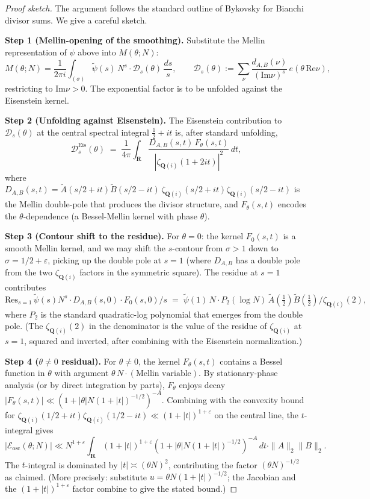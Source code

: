 \documentclass[11pt]{article}
\theoremstyle{definition}
\newcommand{\Q}{\mathbf{Q}}
\newcommand{\R}{\mathbf{R}}
\renewcommand{\Re}{\mathrm{Re}}
\renewcommand{\Im}{\mathrm{Im}}
\begin{document}
\begin{proof}[Proof sketch]
The argument follows the standard outline of Bykovsky \cite{bykovsky} for Bianchi divisor sums. We give a careful sketch.

\smallskip\textbf{Step 1 (Mellin-opening of the smoothing).}
Substitute the Mellin representation of $\psi$ above into $M(\theta;N)$:
\[
    M(\theta;N) = \frac{1}{2\pi i} \int_{(\sigma)} \widetilde\psi(s)\, N^s \cdot \mathcal{D}_s(\theta)\,\frac{ds}{s}, \qquad
    \mathcal{D}_s(\theta) := \sum_\nu \frac{d_{A,B}(\nu)}{(\Im\nu)^s}\, e(\theta\,\Re\nu),
\]
restricting to $\Im\nu > 0$. The exponential factor is to be unfolded against the Eisenstein kernel.

\smallskip\textbf{Step 2 (Unfolding against Eisenstein).}
The Eisenstein contribution to $\mathcal{D}_s(\theta)$ at the central spectral integral $\frac{1}{2}+it$ is, after standard unfolding,
\[
    \mathcal{D}_s^{\mathrm{Eis}}(\theta) \;=\; \frac{1}{4\pi}\int_\R \frac{D_{A,B}(s,t)\, F_\theta(s,t)}{|\zeta_{\Q(i)}(1+2it)|^2}\,dt,
\]
where $D_{A,B}(s,t) = \widetilde A(s/2 + it) \widetilde B(s/2 - it)\,\zeta_{\Q(i)}(s/2+it)\zeta_{\Q(i)}(s/2-it)$ is the Mellin double-pole that produces the divisor structure, and $F_\theta(s,t)$ encodes the $\theta$-dependence (a Bessel-Mellin kernel with phase $\theta$).

\smallskip\textbf{Step 3 (Contour shift to the residue).}
For $\theta = 0$: the kernel $F_0(s,t)$ is a smooth Mellin kernel, and we may shift the $s$-contour from $\sigma > 1$ down to $\sigma = 1/2 + \varepsilon$, picking up the double pole at $s = 1$ (where $D_{A,B}$ has a double pole from the two $\zeta_{\Q(i)}$ factors in the symmetric square). The residue at $s=1$ contributes
\[
    \mathrm{Res}_{s=1}\,\widetilde\psi(s) N^s \cdot D_{A,B}(s,0) \cdot F_0(s,0)/s \;=\; \widetilde\psi(1)\,N \cdot P_2(\log N)\,\widetilde A(\tfrac{1}{2})\widetilde B(\tfrac{1}{2}) / \zeta_{\Q(i)}(2),
\]
where $P_2$ is the standard quadratic-log polynomial that emerges from the double pole. (The $\zeta_{\Q(i)}(2)$ in the denominator is the value of the residue of $\zeta_{\Q(i)}$ at $s=1$, squared and inverted, after combining with the Eisenstein normalization.)

\smallskip\textbf{Step 4 ($\theta \ne 0$ residual).}
For $\theta \ne 0$, the kernel $F_\theta(s,t)$ contains a Bessel function in $\theta$ with argument $\theta\,N\cdot(\text{Mellin variable})$. By stationary-phase analysis (or by direct integration by parts), $F_\theta$ enjoys decay $|F_\theta(s,t)| \ll (1+|\theta|N(1+|t|)^{-1/2})^{-A}$. Combining with the convexity bound for $\zeta_{\Q(i)}(1/2+it)\zeta_{\Q(i)}(1/2-it) \ll (1+|t|)^{1+\varepsilon}$ on the central line, the $t$-integral gives
\[
    |\mathcal{E}_{\mathrm{osc}}(\theta;N)| \ll N^{1+\varepsilon}\int_\R (1+|t|)^{1+\varepsilon}(1+|\theta|N(1+|t|)^{-1/2})^{-A}\,dt \cdot \|A\|_2\|B\|_2.
\]
The $t$-integral is dominated by $|t| \asymp (\theta N)^2$, contributing the factor $(\theta N)^{-1/2}$ as claimed. (More precisely: substitute $u = \theta N(1+|t|)^{-1/2}$; the Jacobian and the $(1+|t|)^{1+\varepsilon}$ factor combine to give the stated bound.)


\end{proof}
\end{document}
